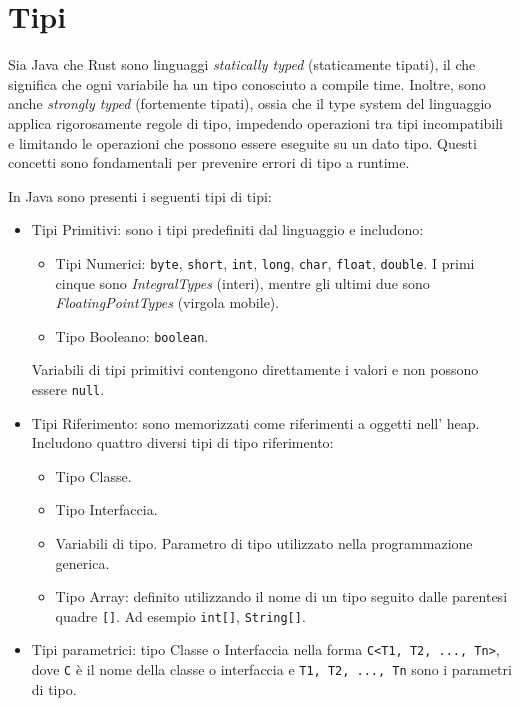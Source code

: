 \section{Tipi}
Sia Java che Rust sono linguaggi \textit{statically typed} (staticamente tipati), il che significa che ogni variabile ha un tipo conosciuto a compile time. Inoltre, sono anche \textit{strongly typed} (fortemente tipati), ossia che il type system del linguaggio applica rigorosamente regole di tipo, impedendo operazioni tra tipi incompatibili e limitando le operazioni che possono essere eseguite su un dato tipo. Questi concetti sono fondamentali per prevenire errori di tipo a runtime.

In Java sono presenti i seguenti tipi di tipi:
\begin{itemize}
    \item Tipi Primitivi: sono i tipi predefiniti dal linguaggio e includono:
        \begin{itemize}
            \item Tipi Numerici: \texttt{byte}, \texttt{short}, \texttt{int}, \texttt{long}, \texttt{char}, \texttt{float}, \texttt{double}. I primi cinque sono \textit{IntegralTypes} (interi), mentre gli ultimi due sono \textit{FloatingPointTypes} (virgola mobile).
            \item Tipo Booleano: \texttt{boolean}.
        \end{itemize} 
        Variabili di tipi primitivi contengono direttamente i valori e non possono essere \texttt{null}.
    \item Tipi Riferimento: sono memorizzati come riferimenti a oggetti nell' heap. Includono quattro diversi tipi di tipo riferimento:
        \begin{itemize}
            \item Tipo Classe.
            \item Tipo Interfaccia.
            \item Variabili di tipo. Parametro di tipo utilizzato nella programmazione generica. 
            \item Tipo Array: definito utilizzando il nome di un tipo seguito dalle parentesi quadre \texttt{[]}. Ad esempio \texttt{int[]}, \texttt{String[]}.
        \end{itemize}
    \item Tipi parametrici: tipo Classe o Interfaccia nella forma \texttt{C<T1, T2, ..., Tn>}, dove \texttt{C} è il nome della classe o interfaccia e \texttt{T1, T2, ..., Tn} sono i parametri di tipo.
\end{itemize}
